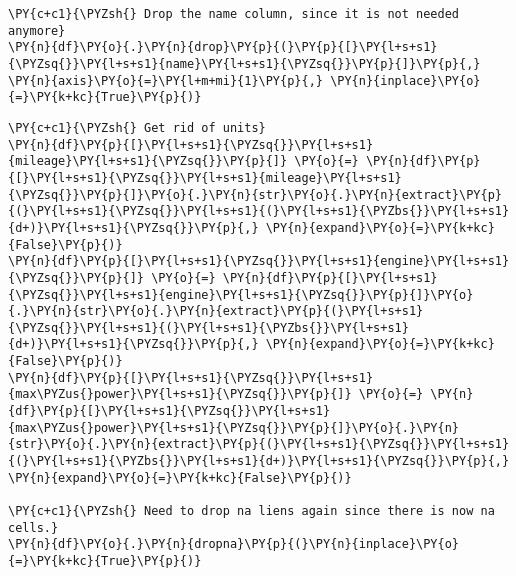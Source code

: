 \begin{tcolorbox}[breakable, size=fbox, boxrule=1pt, pad at break*=1mm,colback=cellbackground, colframe=cellborder]
\begin{Verbatim}[commandchars=\\\{\}]
\PY{c+c1}{\PYZsh{} Drop the name column, since it is not needed anymore}
\PY{n}{df}\PY{o}{.}\PY{n}{drop}\PY{p}{(}\PY{p}{[}\PY{l+s+s1}{\PYZsq{}}\PY{l+s+s1}{name}\PY{l+s+s1}{\PYZsq{}}\PY{p}{]}\PY{p}{,} \PY{n}{axis}\PY{o}{=}\PY{l+m+mi}{1}\PY{p}{,} \PY{n}{inplace}\PY{o}{=}\PY{k+kc}{True}\PY{p}{)}
\end{Verbatim}
\end{tcolorbox}

\begin{tcolorbox}[breakable, size=fbox, boxrule=1pt, pad at break*=1mm,colback=cellbackground, colframe=cellborder]
\begin{Verbatim}[commandchars=\\\{\}]
\PY{c+c1}{\PYZsh{} Get rid of units}
\PY{n}{df}\PY{p}{[}\PY{l+s+s1}{\PYZsq{}}\PY{l+s+s1}{mileage}\PY{l+s+s1}{\PYZsq{}}\PY{p}{]} \PY{o}{=} \PY{n}{df}\PY{p}{[}\PY{l+s+s1}{\PYZsq{}}\PY{l+s+s1}{mileage}\PY{l+s+s1}{\PYZsq{}}\PY{p}{]}\PY{o}{.}\PY{n}{str}\PY{o}{.}\PY{n}{extract}\PY{p}{(}\PY{l+s+s1}{\PYZsq{}}\PY{l+s+s1}{(}\PY{l+s+s1}{\PYZbs{}}\PY{l+s+s1}{d+)}\PY{l+s+s1}{\PYZsq{}}\PY{p}{,} \PY{n}{expand}\PY{o}{=}\PY{k+kc}{False}\PY{p}{)}
\PY{n}{df}\PY{p}{[}\PY{l+s+s1}{\PYZsq{}}\PY{l+s+s1}{engine}\PY{l+s+s1}{\PYZsq{}}\PY{p}{]} \PY{o}{=} \PY{n}{df}\PY{p}{[}\PY{l+s+s1}{\PYZsq{}}\PY{l+s+s1}{engine}\PY{l+s+s1}{\PYZsq{}}\PY{p}{]}\PY{o}{.}\PY{n}{str}\PY{o}{.}\PY{n}{extract}\PY{p}{(}\PY{l+s+s1}{\PYZsq{}}\PY{l+s+s1}{(}\PY{l+s+s1}{\PYZbs{}}\PY{l+s+s1}{d+)}\PY{l+s+s1}{\PYZsq{}}\PY{p}{,} \PY{n}{expand}\PY{o}{=}\PY{k+kc}{False}\PY{p}{)}
\PY{n}{df}\PY{p}{[}\PY{l+s+s1}{\PYZsq{}}\PY{l+s+s1}{max\PYZus{}power}\PY{l+s+s1}{\PYZsq{}}\PY{p}{]} \PY{o}{=} \PY{n}{df}\PY{p}{[}\PY{l+s+s1}{\PYZsq{}}\PY{l+s+s1}{max\PYZus{}power}\PY{l+s+s1}{\PYZsq{}}\PY{p}{]}\PY{o}{.}\PY{n}{str}\PY{o}{.}\PY{n}{extract}\PY{p}{(}\PY{l+s+s1}{\PYZsq{}}\PY{l+s+s1}{(}\PY{l+s+s1}{\PYZbs{}}\PY{l+s+s1}{d+)}\PY{l+s+s1}{\PYZsq{}}\PY{p}{,} \PY{n}{expand}\PY{o}{=}\PY{k+kc}{False}\PY{p}{)}

\PY{c+c1}{\PYZsh{} Need to drop na liens again since there is now na cells.}
\PY{n}{df}\PY{o}{.}\PY{n}{dropna}\PY{p}{(}\PY{n}{inplace}\PY{o}{=}\PY{k+kc}{True}\PY{p}{)}
\end{Verbatim}
\end{tcolorbox}

